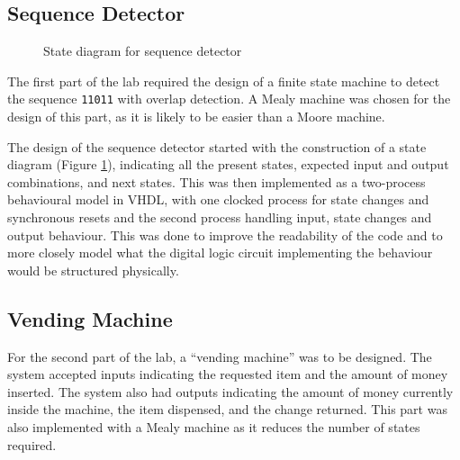 \documentclass[12pt]{article}
\begin{document}
\subsection{Sequence Detector}
\begin{figure}[h]
  \centering
  \caption{State diagram for sequence detector}
  \label{fig:state-diagram}
\end{figure}

The first part of the lab required the design of a finite state machine to detect the sequence \verb|11011| with overlap detection. A Mealy machine was chosen for the design of this part, as it is likely to be easier than a Moore machine.

The design of the sequence detector started with the construction of a state diagram (Figure \ref{fig:state-diagram}), indicating all the present states, expected input and output combinations, and next states.
This was then implemented as a two-process behavioural model in VHDL, with one clocked process for state changes and synchronous resets and the second process handling input, state changes and output behaviour. This was done to improve the readability of the code and to more closely model what the digital logic circuit implementing the behaviour would be structured physically.

\subsection{Vending Machine}

For the second part of the lab, a ``vending machine'' was to be designed. The system accepted inputs indicating the requested item and the amount of money inserted. The system also had outputs indicating the amount of money currently inside the machine, the item dispensed, and the change returned. This part was also implemented with a Mealy machine as it reduces the number of states required.
\end{document}
